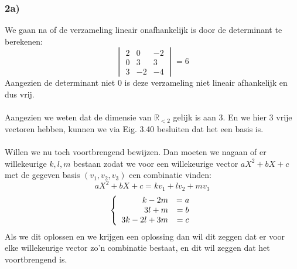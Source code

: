 \documentclass[lineaire_algebra_oplossingen.tex]{subfiles}
\begin{document}
\subsubsection*{2a)}
We gaan na of de verzameling lineair onafhankelijk is door de determinant te berekenen:
\[
\begin{vmatrix}
2 & 0 & -2\\
0&3&3\\
3&-2&-4
\end{vmatrix}
= 6
\]
Aangezien de determinant niet 0 is deze verzameling niet lineair afhankelijk en dus vrij.
\\
\\
Aangezien we weten dat de dimensie van $\mathbb{R}_{<2}$ gelijk is aan 3. En we hier 3 vrije vectoren hebben, kunnen we via Eig. 3.40 besluiten dat het een basis is.
\\
\\
Willen we nu toch voortbrengend bewijzen. Dan moeten we nagaan of er willekeurige $k,l,m$ bestaan zodat we voor een willekeurige vector $aX^2+bX+c$ met de gegeven basis $(v_1,v_2,v_3)$ een combinatie vinden:
$$
aX^2+bX+c = kv_1+lv_2+mv_3
$$
$$
\left\lbrace
\begin{array}{r c}
k-2m &= a\\
3l+m &= b\\
3k-2l+3m &= c
\end{array}
\right.
$$
Als we dit oplossen en we krijgen een oplossing dan wil dit zeggen dat er voor elke willekeurige vector zo'n combinatie bestaat, en dit wil zeggen dat het voortbrengend is.
\end{document}
